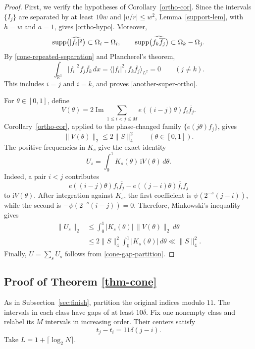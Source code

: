 \documentclass{amsart}
\numberwithin{equation}{section}
\newcommand{\wh}{\widehat}
\newcommand{\ZR}{\mathbb{R}}
\newcommand{\supp}{{\rm supp}}
\begin{document}
\begin{proof}
First, we verify the hypotheses of Corollary~\ref{ortho-cor}.
Since the intervals $\{I_j\}$ are separated by at least $10w$ and $|u/r|\leq w^2$, Lemma~\ref{support-lem}, with $h=w$ and $a=1$, gives \eqref{ortho-hypo}. 
Moreover,
\[
    \supp\big(\wh{|f_i|^2}\big)\subset\Omega_i-\Omega_i,
    \qquad
    \supp\big(\wh{f_k\overline{f_j}}\big)
      \subset\Omega_k-\Omega_j.
\]
By \eqref{cone-repeated-separation} and Plancherel's theorem,
\[
    \int_{\ZR^3}|f_i|^2f_j\overline{f_k}\,dx
    =\langle|f_i|^2,f_k\overline{f_j}\rangle_{L^2}=0
    \qquad(j\ne k).
\]
This includes $i=j$ and $i=k$, and proves
\eqref{another-super-ortho}.

For $\theta\in[0,1]$, define
\[
    V(\theta)=2\operatorname{Im}\sum_{1\leq i<j\leq M}
      e((i-j)\theta)f_i\overline{f_j}.
\]
Corollary~\ref{ortho-cor}, applied to the phase-changed family
$\{e(j\theta)f_j\}$, gives
\[
    \|V(\theta)\|_2\leq2\|S\|_4^2
    \qquad(\theta\in[0,1]).
\]
The positive frequencies in $K_s$ give the exact identity
\begin{equation}
\label{cone-phase-recovery}
    U_s=\int_0^1K_s(\theta)\,\mathrm{i}V(\theta)\,d\theta.
\end{equation}
Indeed, a pair $i<j$ contributes
\[
    e((i-j)\theta)f_i\overline{f_j}
    -e((j-i)\theta)\overline{f_i}f_j
\]
to $\mathrm{i}V(\theta)$. 
After integration against $K_s$, the first coefficient is $\psi(2^{-s}(j-i))$, while the second is
$-\psi(2^{-s}(i-j))=0$. 
Therefore, Minkowski's inequality gives
\begin{align*}
    \|U_s\|_2
    &\leq\int_0^1|K_s(\theta)|\,\|V(\theta)\|_2\,d\theta\\
    &\leq2\|S\|_4^2\int_0^1|K_s(\theta)|\,d\theta
      \ll\|S\|_4^2.
\end{align*}
Finally, $U=\sum_s U_s$ follows from \eqref{cone-gap-partition}.
\end{proof}

\medskip 

\subsection{Proof of Theorem \ref{thm-cone}}
\label{sec:cone-proof}

As in Subsection~\ref{sec:finish}, partition the original indices modulo $11$. 
The intervals in each class have gaps of at least $10\delta$. 
Fix one nonempty class and relabel its $M$ intervals in increasing order. 
Their centers satisfy
\begin{equation}
\label{cone-center-spacing}
    t_j-t_i=11\delta(j-i).
\end{equation}
Take $L=1+\lceil\log_2 N\rceil$. 
\end{document}

